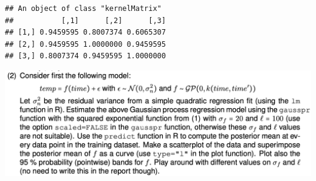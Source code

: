 \documentclass[
]{article}
\begin{document}
\begin{verbatim}
## An object of class "kernelMatrix"
##           [,1]      [,2]      [,3]
## [1,] 0.9459595 0.8007374 0.6065307
## [2,] 0.9459595 1.0000000 0.9459595
## [3,] 0.8007374 0.9459595 1.0000000
\end{verbatim}

\includegraphics{images/Screenshot 2024-10-13 at 17.13.16.png}
\end{document}
